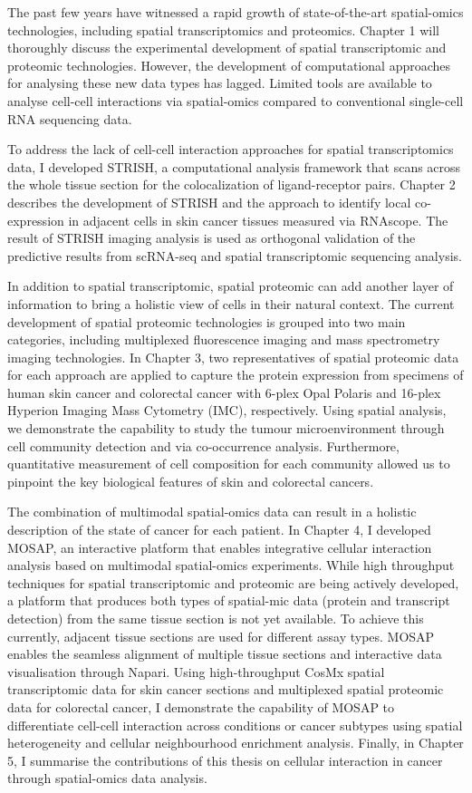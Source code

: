 The past few years have witnessed a rapid growth of state-of-the-art spatial-omics technologies, including spatial transcriptomics and proteomics. Chapter 1 will thoroughly discuss the experimental development of spatial transcriptomic and proteomic technologies. However, the development of computational approaches for analysing these new data types has lagged. Limited tools are available to analyse cell-cell interactions via spatial-omics compared to conventional single-cell RNA sequencing data. 

To address the lack of cell-cell interaction approaches for spatial transcriptomics data, I developed STRISH, a computational analysis framework that scans across the whole tissue section for the colocalization of ligand-receptor pairs. Chapter 2 describes the development of STRISH and the approach to identify local co-expression in adjacent cells in skin cancer tissues measured via RNAscope. The result of STRISH imaging analysis is used as orthogonal validation of the predictive results from scRNA-seq and spatial transcriptomic sequencing analysis.

In addition to spatial transcriptomic, spatial proteomic can add another layer of information to bring a holistic view of cells in their natural context. The current development of spatial proteomic technologies is grouped into two main categories, including multiplexed fluorescence imaging and mass spectrometry imaging technologies. In Chapter 3, two representatives of spatial proteomic data for each approach are applied to capture the protein expression from specimens of human skin cancer and colorectal cancer with 6-plex Opal Polaris and 16-plex Hyperion Imaging Mass Cytometry (IMC), respectively. Using spatial analysis, we demonstrate the capability to study the tumour microenvironment through cell community detection and via co-occurrence analysis. Furthermore, quantitative measurement of cell composition for each community allowed us to pinpoint the key biological features of skin and colorectal cancers.  

The combination of multimodal spatial-omics data can result in a holistic description of the state of cancer for each patient. In Chapter 4, I developed MOSAP, an interactive platform that enables integrative cellular interaction analysis based on multimodal spatial-omics experiments. While high throughput techniques for spatial transcriptomic and proteomic are being actively developed, a platform that produces both types of spatial-mic data (protein and transcript detection) from the same tissue section is not yet available. To achieve this currently, adjacent tissue sections are used for different assay types. MOSAP enables the seamless alignment of multiple tissue sections and interactive data visualisation through Napari. Using high-throughput CosMx spatial transcriptomic data for skin cancer sections and multiplexed spatial proteomic data for colorectal cancer, I demonstrate the capability of MOSAP to differentiate cell-cell interaction across conditions or cancer subtypes using spatial heterogeneity and cellular neighbourhood enrichment analysis. Finally, in Chapter 5, I summarise the contributions of this thesis on cellular interaction in cancer through spatial-omics data analysis.

